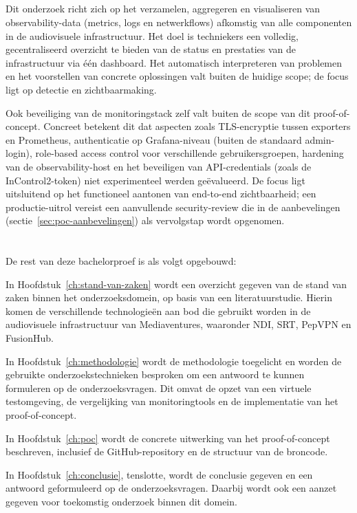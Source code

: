\subsection{}%
\label{sec:afbakening-scope}

Dit onderzoek richt zich op het verzamelen, aggregeren en visualiseren van observability-data (metrics, logs en netwerkflows) afkomstig van alle componenten in de audiovisuele infrastructuur. Het doel is techniekers een volledig, gecentraliseerd overzicht te bieden van de status en prestaties van de infrastructuur via één dashboard. Het automatisch interpreteren van problemen en het voorstellen van concrete oplossingen valt buiten de huidige scope; de focus ligt op detectie en zichtbaarmaking.

Ook beveiliging van de monitoringstack zelf valt buiten de scope van dit proof-of-concept. Concreet betekent dit dat aspecten zoals TLS-encryptie tussen exporters en Prometheus, authenticatie op Grafana-niveau (buiten de standaard admin-login), role-based access control voor verschillende gebruikersgroepen, hardening van de observability-host en het beveiligen van API-credentials (zoals de InControl2-token) niet experimenteel werden geëvalueerd. De focus ligt uitsluitend op het functioneel aantonen van end-to-end zichtbaarheid; een productie-uitrol vereist een aanvullende security-review die in de aanbevelingen (sectie~\ref{sec:poc-aanbevelingen}) als vervolgstap wordt opgenomen.

\section{}%
\label{sec:opzet-bachelorproef}

De rest van deze bachelorproef is als volgt opgebouwd:

In Hoofdstuk~\ref{ch:stand-van-zaken} wordt een overzicht gegeven van de stand van zaken binnen het onderzoeksdomein, op basis van een literatuurstudie. Hierin komen de verschillende technologieën aan bod die gebruikt worden in de audiovisuele infrastructuur van Mediaventures, waaronder NDI, SRT, PepVPN en FusionHub.

In Hoofdstuk~\ref{ch:methodologie} wordt de methodologie toegelicht en worden de gebruikte onderzoekstechnieken besproken om een antwoord te kunnen formuleren op de onderzoeksvragen. Dit omvat de opzet van een virtuele testomgeving, de vergelijking van monitoringtools en de implementatie van het proof-of-concept.

In Hoofdstuk~\ref{ch:poc} wordt de concrete uitwerking van het proof-of-concept beschreven, inclusief de GitHub-repository en de structuur van de broncode.

In Hoofdstuk~\ref{ch:conclusie}, tenslotte, wordt de conclusie gegeven en een antwoord geformuleerd op de onderzoeksvragen. Daarbij wordt ook een aanzet gegeven voor toekomstig onderzoek binnen dit domein.